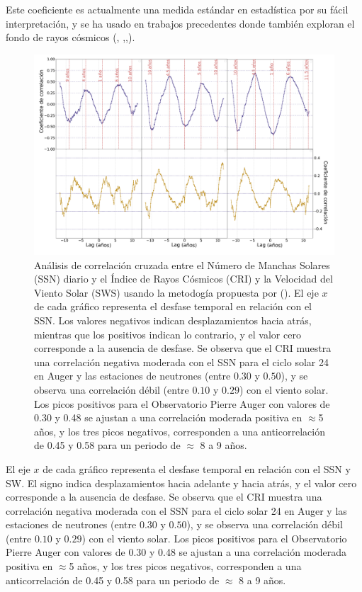 Este coeficiente es actualmente una medida estándar en estadística por su fácil interpretación, y se ha usado en trabajos precedentes donde también exploran el fondo de rayos cósmicos (\cite{Usoskin_2005}, \cite{Oloketuyi_2020},\cite{Mendonça_2019},\cite{Davies_2023}).
\begin{figure}
    \includegraphics[width=1.0\linewidth]{Figs/Figr/09_cross_correlation.pdf}
    \caption{Análisis de correlación cruzada entre el Número de Manchas Solares (SSN) diario y el Índice de Rayos Cósmicos (CRI) y la Velocidad del Viento Solar (SWS) usando la metodogía propuesta por (\cite{Oloketuyi_2020}). El eje $x$ de cada gráfico representa el desfase temporal en relación con el SSN. Los valores negativos indican desplazamientos hacia atrás, mientras que los positivos indican lo contrario, y el valor cero corresponde a la ausencia de desfase. Se observa que el CRI muestra una correlación negativa moderada con el SSN para el ciclo solar 24 en Auger y las estaciones de neutrones (entre $0.30$ y $0.50$), y se observa una correlación débil (entre $0.10$ y $0.29$) con el viento solar. Los picos positivos para el Observatorio Pierre Auger con valores de 0.30 y 0.48 se ajustan a una correlación moderada positiva en $\approx$5 años, y los tres picos negativos, corresponden a una anticorrelación de 0.45 y 0.58 para un periodo de $\approx$ 8 a 9 años.}
    \label{fig:sunspots_corr}
\end{figure}

El eje $x$ de cada gráfico representa el desfase temporal en relación con el SSN y SW. El signo indica desplazamientos hacia adelante y hacia atrás, y el valor cero corresponde a la ausencia de desfase. Se observa que el CRI muestra una correlación negativa moderada con el SSN para el ciclo solar 24 en Auger y las estaciones de neutrones (entre $0.30$ y $0.50$), y se observa una correlación débil (entre $0.10$ y $0.29$) con el viento solar. Los picos positivos para el Observatorio Pierre Auger con valores de 0.30 y 0.48 se ajustan a una correlación moderada positiva en $\approx$5 años, y los tres picos negativos, corresponden a una anticorrelación de 0.45 y 0.58 para un periodo de $\approx$ 8 a 9 años.

